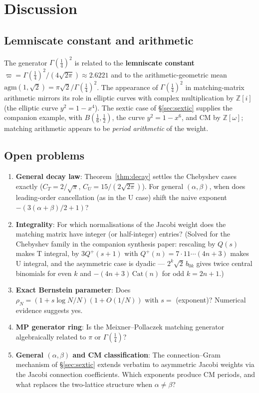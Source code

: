 \documentclass[11pt,a4paper]{article}
\newcommand{\Z}{\mathbb{Z}}
\newcommand{\G}{\Gamma}
\begin{document}
\section{Discussion}

\subsection{Lemniscate constant and arithmetic}

The generator $\G(\tfrac14)^2$ is related to the \textbf{lemniscate constant}
$\varpi=\G(\tfrac14)^2/(4\sqrt{2\pi})\approx2.6221$ and to the arithmetic-geometric
mean $\mathrm{agm}(1,\sqrt{2})=\pi\sqrt{2}/\G(\tfrac14)^2$.
The appearance of $\G(\tfrac14)^2$ in matching-matrix arithmetic mirrors its role
in elliptic curves with complex multiplication by $\Z[i]$
(the elliptic curve $y^2=1-x^4$).
The sextic case of \S\ref{sec:sextic} supplies the companion example, with
$B(\tfrac16,\tfrac12)$, the curve $y^2=1-x^6$, and CM by $\Z[\omega]$;
matching arithmetic appears to be \emph{period arithmetic} of the weight.

\subsection{Open problems}

\begin{enumerate}
\item \textbf{General decay law}: Theorem~\ref{thm:decay} settles the Chebyshev
  cases exactly ($C_T=2/\sqrt\pi$, $C_U=15/(2\sqrt{2\pi})$).  For general
  $(\alpha,\beta)$, when does leading-order cancellation (as in the U case)
  shift the naive exponent $-(3(\alpha+\beta)/2+1)$?
\item \textbf{Integrality}: For which normalisations of the Jacobi weight does the
  matching matrix have integer (or half-integer) entries?
  (Solved for the Chebyshev family in the companion synthesis paper:
  rescaling by $Q(s)$ makes T integral, by $3Q^{+}(s{+}1)$ with
  $Q^{+}(n)=7\cdot11\cdots(4n+3)$ makes U integral, and the asymmetric
  case is dyadic --- $2^k\sqrt2\,b_{0k}$ gives twice central binomials for
  even $k$ and $-(4n+3)\,\mathrm{Cat}(n)$ for odd $k=2n{+}1$.)
\item \textbf{Exact Bernstein parameter}: Does $\rho_N=(1+s\log N/N)(1+O(1/N))$
  with $s=$ (exponent)? Numerical evidence suggests yes.
\item \textbf{MP generator ring}: Is the Meixner--Pollaczek matching generator
  algebraically related to $\pi$ or $\G(\tfrac14)$?
\item \textbf{General $(\alpha,\beta)$ and CM classification}: The
  connection--Gram mechanism of \S\ref{sec:sextic} extends verbatim to
  asymmetric Jacobi weights via the Jacobi connection coefficients.  Which
  exponents produce CM periods, and what replaces the two-lattice structure
  when $\alpha\ne\beta$?
\end{enumerate}
\end{document}
